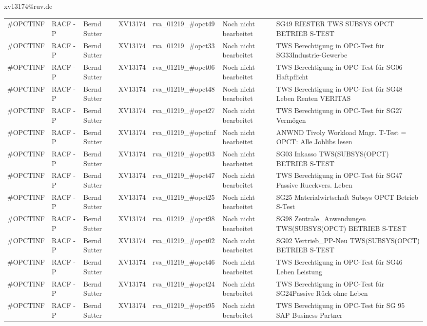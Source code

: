 \documentclass[a4paper,landscape,12pt]{letter}
\begin{document}
\begin{letter}{xv13174@ruv.de\hfill \break}
\begin{tiny}
\begin{longtable}{|p{35mm}|p{15mm}|p{25mm}|p{10mm}|p{40mm}|p{50mm}|p{50mm}|}
\#OPCTINF & RACF - P & Bernd Sutter & XV13174 & rva\_01219\_\#opct49 & Noch nicht bearbeitet & SG49 RIESTER TWS SUBSYS OPCT BETRIEB S-TEST \\
\#OPCTINF & RACF - P & Bernd Sutter & XV13174 & rva\_01219\_\#opct33 & Noch nicht bearbeitet & TWS Berechtigung in OPC-Test für SG33Industrie-Gewerbe \\
\#OPCTINF & RACF - P & Bernd Sutter & XV13174 & rva\_01219\_\#opct06 & Noch nicht bearbeitet & TWS Berechtigung in OPC-Test für SG06 Haftpflicht \\
\#OPCTINF & RACF - P & Bernd Sutter & XV13174 & rva\_01219\_\#opct48 & Noch nicht bearbeitet & TWS Berechtigung in OPC-Test für SG48 Leben Renten VERITAS \\
\#OPCTINF & RACF - P & Bernd Sutter & XV13174 & rva\_01219\_\#opct27 & Noch nicht bearbeitet & TWS Berechtigung in OPC-Test für SG27 Vermögen \\
\#OPCTINF & RACF - P & Bernd Sutter & XV13174 & rva\_01219\_\#opctinf & Noch nicht bearbeitet & ANWND Tivoly Workload Mngr. T-Test = OPCT: Alle Joblibs lesen \\
\#OPCTINF & RACF - P & Bernd Sutter & XV13174 & rva\_01219\_\#opct03 & Noch nicht bearbeitet & SG03 Inkasso TWS(SUBSYS(OPCT) BETRIEB S-TEST \\
\#OPCTINF & RACF - P & Bernd Sutter & XV13174 & rva\_01219\_\#opct47 & Noch nicht bearbeitet & TWS Berechtigung in OPC-Test für SG47 Passive Rueckvers. Leben \\
\#OPCTINF & RACF - P & Bernd Sutter & XV13174 & rva\_01219\_\#opct25 & Noch nicht bearbeitet & SG25 Materialwirtschaft Subsys OPCT Betrieb S-Test \\
\#OPCTINF & RACF - P & Bernd Sutter & XV13174 & rva\_01219\_\#opct98 & Noch nicht bearbeitet & SG98 Zentrale\_Anwendungen TWS(SUBSYS(OPCT) BETRIEB S-TEST \\
\#OPCTINF & RACF - P & Bernd Sutter & XV13174 & rva\_01219\_\#opct02 & Noch nicht bearbeitet & SG02 Vertrieb\_PP-Neu TWS(SUBSYS(OPCT) BETRIEB S-TEST \\
\#OPCTINF & RACF - P & Bernd Sutter & XV13174 & rva\_01219\_\#opct46 & Noch nicht bearbeitet & TWS Berechtigung in OPC-Test für SG46 Leben Leistung \\
\#OPCTINF & RACF - P & Bernd Sutter & XV13174 & rva\_01219\_\#opct24 & Noch nicht bearbeitet & TWS Berechtigung in OPC-Test für SG24Passive Rück ohne Leben \\
\#OPCTINF & RACF - P & Bernd Sutter & XV13174 & rva\_01219\_\#opct95 & Noch nicht bearbeitet &  TWS Berechtigung in OPC-Test für SG 95 SAP Business Partner \\

\end{longtable}
\end{tiny}
\end{letter}
\end{document}
